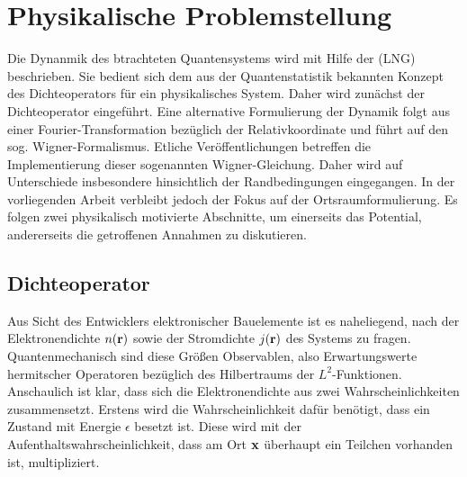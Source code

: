 \chapter{Physikalische Problemstellung}

Die Dynanmik des btrachteten Quantensystems wird mit Hilfe der \lvn (LNG) beschrieben. Sie bedient sich dem aus der Quantenstatistik bekannten Konzept des Dichteoperators für ein physikalisches System. Daher wird zunächst der Dichteoperator  eingeführt. Eine alternative Formulierung der Dynamik folgt aus einer Fourier-Transformation bezüglich der Relativkoordinate und führt auf den sog. Wigner-Formalismus. Etliche Veröffentlichungen betreffen die Implementierung dieser sogenannten Wigner-Gleichung. Daher wird auf Unterschiede insbesondere hinsichtlich der Randbedingungen eingegangen. In der vorliegenden Arbeit verbleibt jedoch der Fokus auf der Ortsraumformulierung. Es folgen zwei physikalisch motivierte Abschnitte, um einerseits das Potential, andererseits die getroffenen Annahmen zu diskutieren.

\section{Dichteoperator} 
\label{sec:2_1}
Aus Sicht des Entwicklers elektronischer Bauelemente ist es naheliegend, nach der Elektronendichte $n(\vb{r})$ sowie der Stromdichte $j(\vb{r})$ des Systems zu fragen. Quantenmechanisch sind diese Größen Observablen, also Erwartungswerte hermitscher Operatoren bezüglich des Hilbertraums der $L^2$-Funktionen. Anschaulich ist klar, dass sich die Elektronendichte aus zwei Wahrscheinlichkeiten zusammensetzt. Erstens wird die Wahrscheinlichkeit dafür benötigt, dass ein Zustand mit Energie $\epsilon$ besetzt ist. Diese wird mit der Aufenthaltswahrscheinlichkeit, dass am Ort $\vb{x}$ überhaupt ein Teilchen vorhanden ist, multipliziert.

